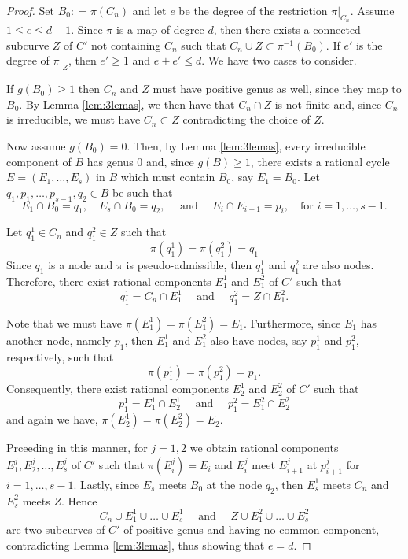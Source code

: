 \documentclass[10pt,a4paper]{amsart}
\newcommand{\ee}{\quad\text{ and }\quad}
\begin{document}
\begin{proof}
Set $B_0: = \pi(C_n)$ and 
let $e$ be the degree of the restriction  $\pi|_{C_n}$.  %
Assume $1\leq e \leq d-1$. 
Since $\pi$ is a map of degree $d$, then there exists a connected subcurve $Z$ of ${C}'$ not containing $C_n$ such that $C_n \cup Z\subset \pi^{-1}(B_0) $. 
If $e'$ is the degree of $\pi|_Z$, then $e'\geq 1$ and $e+e'\leq d$. 
We have two cases to consider.


If $g(B_0)\geq 1$ then $C_n$ and $Z$ must have positive genus as well, since they map to $B_0$. 
By Lemma \ref{lem:3lemas}, we then have that $C_n \cap Z$  is not finite
and,  since $C_n$ is irreducible, we must have $C_n\subset Z$ contradicting the choice of $Z$.

%

Now assume $g(B_0)=0$. Then, by Lemma \ref{lem:3lemas},
every irreducible component of $B$ has genus 0  and, since $g(B)\geq 1$, there exists a rational cycle $E=(E_1,\ldots,E_s)$ in $B$ which  must contain $B_0$, say $E_1=B_0$. 
Let
$q_1,p_1, \ldots, p_{s-1},q_2\in B$ be such that
$$E_1 \cap B_0 = {q_1},
\quad E_s \cap B_0 = {q_2},
\quad \text{ and } \quad 
E_{i}\cap E_{i+1}= {p_{i}},
\quad \text{for } i =1, \ldots, s-1. $$

Let $q^1_1 \in C_n$ and $q_1^2 \in Z$ such that
$$\pi(q_1^1)= \pi(q_1^2)= q_1$$
Since $q_1$ is a node and $\pi$ is pseudo-admissible, then $q_1^1$ and $q_1^2$ are also nodes. Therefore, there exist rational components $E_1^1$ and $E_1^2$ of $C'$  such that
$$q_1^1 = C_n \cap E_1^1\ee q_1^2= Z \cap E_1^2.$$


Note that we must have $\pi(E_1^1)= \pi(E_1^2)= E_1$. 
Furthermore, since $E_1$ has another node, namely $p_1$, then $E_1^1$ and $E_1^2$ also have nodes, say $p_1^1$ and $p_1^2$, respectively, such that
$$\pi(p_1^1)= \pi(p_1^2)= p_1. $$
Consequently, there exist rational components $E_2^1$ and $E_2^2$  of $C'$ such that
$$p_1^1 = E_1^1 \cap E_2^1\ee p_1^2= E_1^2 \cap E_2^2$$
and again
we have, $\pi(E_2^1)=\pi(E_2^2)=E_2$.


Prceeding in this manner, for $j=1,2$ we obtain rational components 
$E_1^j,E_2^j,\ldots, E_{s}^j$  of $C'$
such that  $\pi(E_i^j)=E_i$
and
$E^j_i$ meet $E^j_{i+1}$ at $p^j_{i+1}$ for $i=1,\ldots,s-1$.
Lastly, since $E_{s}$ meets $B_0$ at the node $q_2$, then 
$ E_{s}^1$ meets $C_n$ and 
$ E_{s}^2$ meets $Z$.
Hence 
$$C_n \cup E_1^1 \cup \ldots \cup E_s^1 
\ee
Z\cup E_1^2\cup \ldots \cup E_s^2$$
are two subcurves of ${C}'$ of positive genus and having no common component, contradicting Lemma \ref{lem:3lemas}, thus showing that $e=d$.
 \end{proof}   
\end{document}
